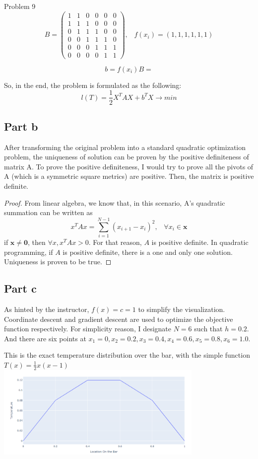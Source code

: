\documentclass[10pt]{article}
\begin{document}
\begin{section}{Problem 9}
\[B = \begin{pmatrix}
1 & 1 & 0 & 0 & 0 &0\\
1 & 1 & 1 & 0 & 0 &0\\
0 & 1 & 1 & 1 & 0 &0\\
0 & 0 & 1 & 1 & 1 &0\\
0 & 0 & 0 & 1 & 1 &1\\
0 & 0 & 0 & 0 & 1 &1 \end{pmatrix}, \;\;\; f(x_i) = (1, 1, 1, 1, 1, 1)\]

\[b = f(x_i)B =  \]

So, in the end, the problem is formulated as the following: 
\[l(T) = \frac{1}{2} X^T A X + b^T X \to min\]

\subsection{Part b}
After transforming the original problem into a standard quadratic optimization problem, the uniqueness of solution can be proven by the positive definiteness of matrix A. To prove the positive definiteness, I would try to prove all the pivots of A (which is a symmetric square metrics) are positive. Then, the matrix is positive definite. 
\begin{proof}
	From linear algebra, we know that, in this scenario, A's quadratic summation can be written as
	\[x^T A x = \sum_{i=1}^{N-1}(x_{i+1} - x_{i})^2, \;\;\; \forall x_i \in \mathbf{x}\]
	if $\mathbf{x} \neq \mathbf{0}$, then $ \forall x, x^T A x >0$. For that reason, $A$ is positive definite. In quadratic programming, if $A$ is positive definite, there is a one and only one solution. Uniqueness is proven to be true. 
\end{proof}

\subsection{Part c}
As hinted by the instructor, $f(x) = c = 1$ to simplify the visualization. Coordinate descent and gradient descent are used to optimize the objective function respectively. For simplicity reason, I designate $N = 6$ such that $h = 0.2$. And there are six points at $x_1 = 0, x_2 = 0.2, x_3 = 0.4, x_4 = 0.6, x_5 = 0.8, x_6 = 1.0$. 

This is the exact temperature distribution over the bar, with the simple function $T(x) = \frac{1}{2}x(x-1)$\\
\includegraphics[width=10cm]{img/problem9_plt1.png}


\end{section}
\end{document}
